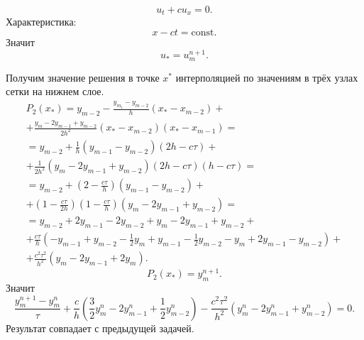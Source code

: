 \documentclass[a4paper]{article}
\begin{document}
\begin{sol}
\[
u_t+c u_x=0
.\] 
Характеристика:
\[
	x- c t= \mathrm{const}
.\] 
Значит
\[
	u_* = u_{m}^{n+1}
.\] 

Получим значение решения в точке $x^*$ интерполяцией
по значениям в трёх узлах сетки на нижнем слое.
\begin{multline*}
	P_2 (x_*)= y_{m-2} - \frac{y_{m_1}-y_{m-2}}{h}
	(x_*-x_{m-2})+\\+
	\frac{y_m-2y_{m-1}+ y_{m-2}}{2h^2}(x_*-x_{m-2})
	(x_*-x_{m-1})=\\= y_{m-2}+ \frac{1}{h}
	\left( y_{m-1}-y_{m-2} \right) (2h-c\tau)
	+\\+ \frac{1}{2h^2}\left( 
	y_m- 2y_{m-1}+y_{m-2}\right) \left( 2h-c\tau \right) 
	(h-c\tau)=\\=
	y_{m-2}+ \left( 2-\frac{c\tau}{h} \right) \left( 
	y_{m-1}-y_{m-2}\right) +\\+
	\left( 1-\frac{c\tau}{2h} \right) \left( 
	1- \frac{c\tau}{h}\right) \left( 
y_m-2 y_{m-1}+y_{m-2}\right) =\\=
y_{m-2}+2y_{m-1}-2y_{m-2}+y_m-2y_{m-1}+y_{m-2}+\\
+\frac{c\tau}{h}\left( -y_{m-1}+ y_{m-2}-\frac{1}{2}
y_m+y_{m-1}-\frac{1}{2}y_{m-2}-y_m+2y_{m-1}-y_{m-2}\right) +\\+
\frac{c^2\tau^2}{h^2}\left( y_m-2y_{m-1}+2y_m \right) 
.\end{multline*} 
\[
	P_2(x_*)=y_m^{n+1}
.\] 
Значит
\[
\frac{y_m^{n+1}-y_m^n}{\tau}+
\frac{c}{h} \left( \frac{3}{2} y_m^n-2y_{m-1}^n+\frac{1}{2}
y_{m-2}^n\right) - \frac{c^2\tau^2}{h^2}(y_m^n-2y_{m-1}^n+
y_{m-2}^n)=0
.\] 
Результат совпадает с предыдущей задачей.
\end{sol}
\begin{hiProb}[7.8]
\end{hiProb}
\end{document}
